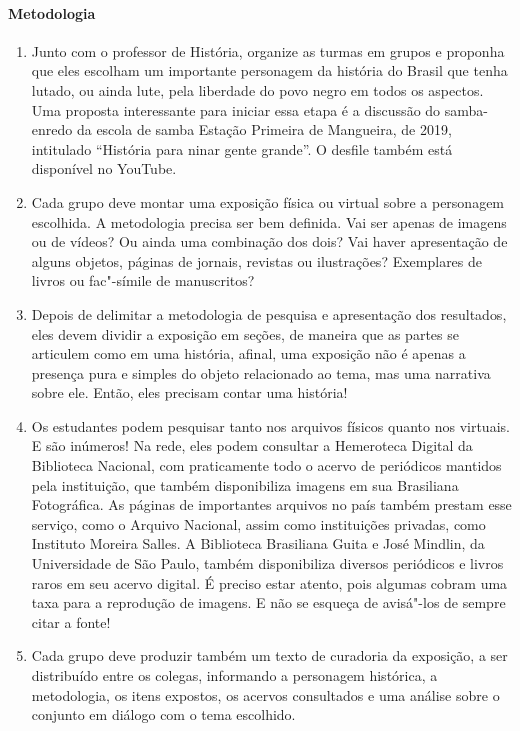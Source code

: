 \documentclass[12pt]{extarticle}
\begin{document}
\paragraph{Metodologia}
\begin{enumerate}
\item
Junto com o professor de História, organize as turmas em grupos e proponha que
eles escolham um importante personagem da história do Brasil que tenha
lutado, ou ainda lute, pela liberdade do povo negro em todos os
aspectos. Uma proposta interessante para iniciar essa etapa é a
discussão do samba-enredo da escola de samba Estação Primeira de
Mangueira, de 2019, intitulado ``História para ninar gente grande''. O
desfile também está disponível no YouTube.


\item
Cada grupo deve montar uma exposição física ou virtual sobre a
personagem escolhida. A metodologia precisa ser bem definida. Vai ser
apenas de imagens ou de vídeos? Ou ainda uma combinação dos dois? Vai
haver apresentação de alguns objetos, páginas de jornais, revistas ou
ilustrações? Exemplares de livros ou fac"-símile de manuscritos?

\item
Depois de delimitar a metodologia de pesquisa e apresentação dos
resultados, eles devem dividir a exposição em seções, de maneira que as
partes se articulem como em uma história, afinal, uma exposição não é
apenas a presença pura e simples do objeto relacionado ao tema, mas uma
narrativa sobre ele. Então, eles precisam contar uma história!

\item
Os estudantes podem pesquisar tanto nos arquivos físicos quanto nos
virtuais. E são inúmeros! Na rede, eles podem consultar a Hemeroteca
Digital da Biblioteca Nacional, com praticamente todo o acervo de
periódicos mantidos pela instituição, que também disponibiliza imagens
em sua Brasiliana Fotográfica. As páginas de importantes arquivos no
país também prestam esse serviço, como o Arquivo Nacional, assim como
instituições privadas, como Instituto Moreira Salles. A Biblioteca
Brasiliana Guita e José Mindlin, da Universidade de São Paulo, também
disponibiliza diversos periódicos e livros raros em seu acervo digital.
É preciso estar atento, pois algumas cobram uma taxa para a reprodução
de imagens. E não se esqueça de avisá"-los de sempre citar a fonte!

\item
Cada grupo deve produzir também um texto de curadoria da exposição, a
ser distribuído entre os colegas, informando a personagem histórica, a
metodologia, os itens expostos, os acervos consultados e uma análise
sobre o conjunto em diálogo com o tema escolhido.
\end{enumerate}
\end{document}
